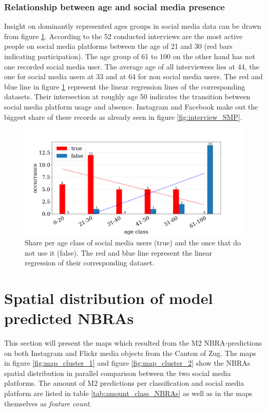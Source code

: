 \subsubsection{Relationship between age and social media presence}
Insight on dominantly represented ages groups in social media data can be drawn from figure \ref{fig:interview_age_SMP}. According to the 52 conducted interviews are the most active people on social media platforms between the age of 21 and 30 (red bars indicating participation). The age group of 61 to 100 on the other hand has not one recorded social media user. The average age of all interviewees lies at 44, the one for social media users at 33 and at 64 for non social media users. The red and blue line in figure \ref{fig:interview_age_SMP} represent the linear regression lines of the corresponding datasets. Their intersection at roughly age 50 indicates the transition between social media platform usage and absence. Instagram and Facebook make out the biggest share of these records as already seen in figure \ref{fig:interview_SMP}.

\begin{figure}[h!]
   \centering
   \includegraphics[width=\textwidth]{img/interview_socialmedia_age_bigger_font.pdf}
   \caption{Share per age class of social media users (true) and the once that do not use it (false). The red and blue line represent the linear regression of their corresponding dataset.}
   \label{fig:interview_age_SMP}
\end{figure}

\section{Spatial distribution of model predicted NBRAs} \label{results_spatial_dist_model_NBRA}
This section will present the maps which resulted from the M2 NBRA-predictions on both Instagram and Flickr media objects from the Canton of Zug. The maps in figure \ref{fig:map_cluster_1} and figure \ref{fig:map_cluster_2} show the NBRAs spatial distribution in parallel comparison between the two social media platforms. The amount of M2 predictions per classification and social media platform are listed in table \ref{tab:amount_class_NBRAs} as well as in the maps themselves as \textit{feature count}.

